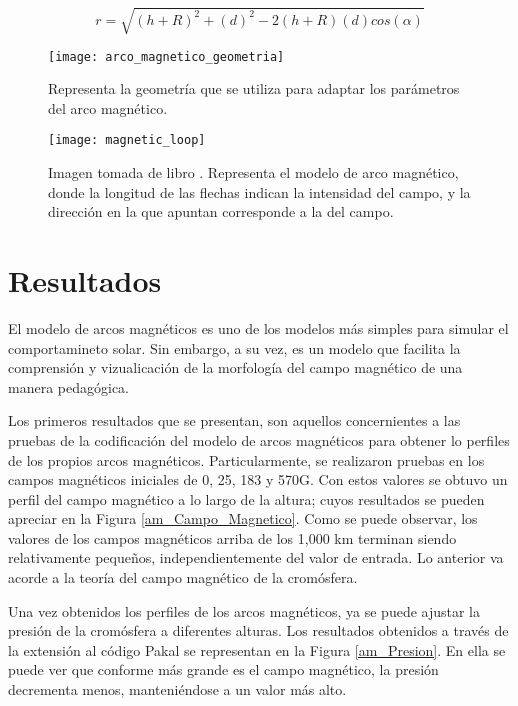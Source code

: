 \begin{equation*} \label{r_equation}
r = \sqrt{ (h+R)^2 + (d)^2 - 2(h+R)(d)cos(\alpha)  }
\end{equation*}

\begin{figure}[h]
\centering
\texttt{[image: arco\_magnetico\_geometria]}
\caption{ Representa la geometr\'ia que se utiliza para adaptar los par\'ametros del arco magn\'etico. }
\label{arco_geometria}
\end{figure}

\begin{figure}[h]
\centering
\texttt{[image: magnetic\_loop]}
\caption{ Imagen tomada de libro \citep{ashwanden} . Representa el modelo de arco magn\'etico, donde la longitud de las flechas indican la intensidad del campo, y la direcci\'on en la que apuntan corresponde a la del campo. }
\label{arco_magnetico}
\end{figure}

\clearpage
\section{Resultados}

El modelo de arcos magn\'eticos es uno de los modelos m\'as simples para simular el comportamineto solar. Sin embargo, a su vez, es un modelo que facilita la comprensi\'on y vizualicaci\'on de la morfolog\'ia del campo magn\'etico de una manera pedag\'ogica.

Los primeros resultados que se presentan, son aquellos concernientes a las pruebas de la codificaci\'on del modelo de arcos magn\'eticos para obtener lo perfiles de los propios arcos magn\'eticos. Particularmente, se realizaron pruebas en los campos magn\'eticos iniciales de 0, 25, 183 y 570G. Con estos valores se obtuvo un perfil del campo magn\'etico a lo largo de la altura; cuyos resultados se pueden apreciar en la Figura \ref{am_Campo_Magnetico}. Como se puede observar, los valores de los campos magn\'eticos arriba de los 1,000 km terminan siendo relativamente peque\~nos, independientemente del valor de entrada. Lo anterior va acorde a la teor\'ia del campo magn\'etico de la crom\'osfera.

Una vez obtenidos los perfiles de los arcos magn\'eticos, ya se puede ajustar la presi\'on de la crom\'osfera a diferentes alturas. Los resultados obtenidos a trav\'es de la extensi\'on al c\'odigo Pakal se representan en la Figura \ref{am_Presion}. En ella se puede ver que conforme m\'as grande es el campo magn\'etico, la presi\'on decrementa menos, manteni\'endose a un valor m\'as alto. 

